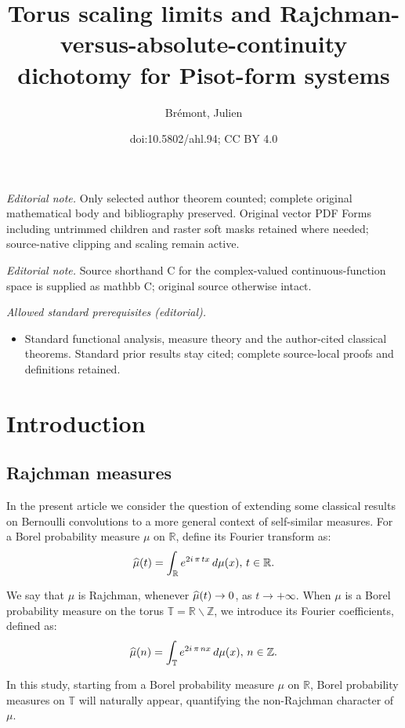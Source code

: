 \documentclass[10pt]{amsart}
\title{Torus scaling limits and Rajchman-versus-absolute-continuity dichotomy for Pisot-form systems}
\author{Brémont, Julien}
\date{doi:10.5802/ahl.94; CC BY 4.0}
\theoremstyle{definition}\newtheorem{defi}[theo]{Definition}\newtheorem{rema}[theo]{Remark}\newtheorem{exam}[theo]{Example}\newtheorem{exem}[theo]{Example}\newtheorem{nota}[theo]{Notation}
\newcommand{\Tbb}{\mathbb T}
\newcommand{\Rbb}{\mathbb R}
\newcommand{\Zbb}{\mathbb Z}
\let\oldhat\hat
\renewcommand*{\hat}[1]{\mathchoice{\widehat{#1}}{\widehat{#1}}{\oldhat{#1}}{\oldhat{#1}}}
\begin{document}
\maketitle
\noindent\textit{Editorial note.} Only selected author theorem counted; complete original mathematical body and bibliography preserved. Original vector PDF Forms including untrimmed children and raster soft masks retained where needed; source-native clipping and scaling remain active.\par\medskip
\noindent\textit{Editorial note.} Source shorthand C for the complex-valued continuous-function space is supplied as mathbb C; original source otherwise intact.\par\medskip
\noindent\textit{Allowed standard prerequisites (editorial).}\begin{itemize}
\item Standard functional analysis, measure theory and the author-cited classical theorems. Standard prior results stay cited; complete source-local proofs and definitions retained.
\end{itemize}\medskip

\section{Introduction}

\subsection{Rajchman measures}
In the present article we consider the question of extending some classical results on Bernoulli convolutions to a more general context of self-similar measures. For a Borel probability measure $\mu$ on $\Rbb$, define its Fourier transform as:
\[
\hat{\mu}(t)=\int_{\Rbb}e^{2i\,\pi\,tx}\,d\mu(x),\,t\in\Rbb.
\]



We say that $\mu$ is Rajchman, whenever $\hat{\mu}(t)\rightarrow0$, as $t\rightarrow+\infty$. When $\mu$ is a Borel probability measure on the torus $\Tbb=\Rbb\backslash\Zbb$, we introduce its Fourier coefficients, defined as:
\[
\hat{\mu}(n)=\int_{\Tbb}e^{2i\,\pi\,nx}\,d\mu(x),\,n\in\Zbb.
\]


In this study, starting from a Borel probability measure $\mu$ on $\Rbb$, Borel probability measures on $\Tbb$ will naturally appear, quantifying the non-Rajchman character of $\mu$.
\end{document}
